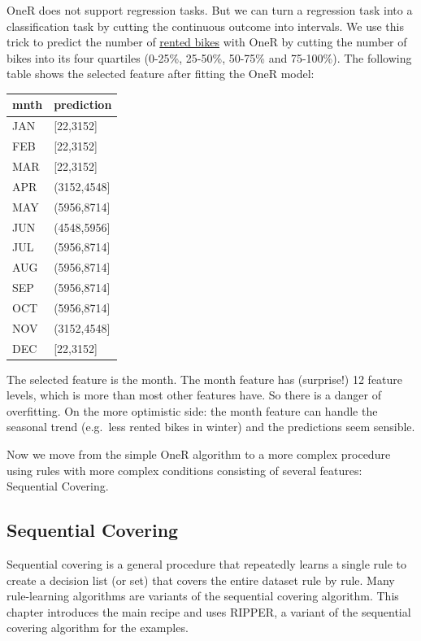 \documentclass[
  10pt,
]{scrbook}
\begin{document}
OneR does not support regression tasks.
But we can turn a regression task into a classification task by cutting the continuous outcome into intervals.
We use this trick to predict the number of \protect\hyperlink{bike-data}{rented bikes} with OneR by cutting the number of bikes into its four quartiles (0-25\%, 25-50\%, 50-75\% and 75-100\%).
The following table shows the selected feature after fitting the OneR model:

\begin{table}
\centering
\begin{tabular}{ll}
\toprule
mnth & prediction\\
\midrule
JAN & {}[22,3152]\\
FEB & {}[22,3152]\\
MAR & {}[22,3152]\\
APR & (3152,4548]\\
MAY & (5956,8714]\\
\addlinespace
JUN & (4548,5956]\\
JUL & (5956,8714]\\
AUG & (5956,8714]\\
SEP & (5956,8714]\\
OCT & (5956,8714]\\
\addlinespace
NOV & (3152,4548]\\
DEC & {}[22,3152]\\
\bottomrule
\end{tabular}
\end{table}

The selected feature is the month.
The month feature has (surprise!) 12 feature levels, which is more than most other features have.
So there is a danger of overfitting.
On the more optimistic side: the month feature can handle the seasonal trend (e.g.~less rented bikes in winter) and the predictions seem sensible.

Now we move from the simple OneR algorithm to a more complex procedure using rules with more complex conditions consisting of several features: Sequential Covering.

\hypertarget{sequential-covering}{%
\subsection{Sequential Covering}\label{sequential-covering}}

Sequential covering is a general procedure that repeatedly learns a single rule to create a decision list (or set) that covers the entire dataset rule by rule.
Many rule-learning algorithms are variants of the sequential covering algorithm.
This chapter introduces the main recipe and uses RIPPER, a variant of the sequential covering algorithm for the examples.
\end{document}
